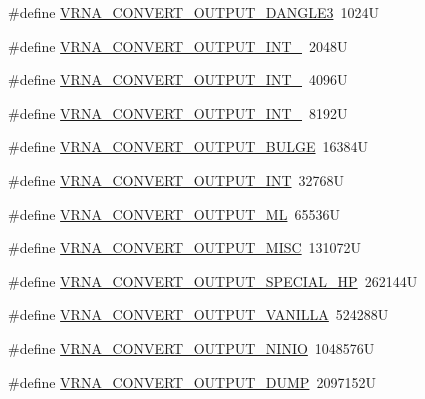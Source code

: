 \begin{DoxyCompactItemize}
\item 
\#define \mbox{\hyperlink{group__energy__parameters__convert_ga34a8a5479ef885834ef32f3fb43d79bc}{V\+R\+N\+A\+\_\+\+C\+O\+N\+V\+E\+R\+T\+\_\+\+O\+U\+T\+P\+U\+T\+\_\+\+D\+A\+N\+G\+L\+E3}}~1024U
\item 
\#define \mbox{\hyperlink{group__energy__parameters__convert_ga079aafefd5f8ab57ee5120099a34bd25}{V\+R\+N\+A\+\_\+\+C\+O\+N\+V\+E\+R\+T\+\_\+\+O\+U\+T\+P\+U\+T\+\_\+\+I\+N\+T\+\_}}~2048U
\item 
\#define \mbox{\hyperlink{group__energy__parameters__convert_gacf770881d9034431ebe741642342a1f9}{V\+R\+N\+A\+\_\+\+C\+O\+N\+V\+E\+R\+T\+\_\+\+O\+U\+T\+P\+U\+T\+\_\+\+I\+N\+T\+\_}}~4096U
\item 
\#define \mbox{\hyperlink{group__energy__parameters__convert_gaa307671e2631cdacad9cbe4c6583b05f}{V\+R\+N\+A\+\_\+\+C\+O\+N\+V\+E\+R\+T\+\_\+\+O\+U\+T\+P\+U\+T\+\_\+\+I\+N\+T\+\_}}~8192U
\item 
\#define \mbox{\hyperlink{group__energy__parameters__convert_ga7092fe0be4de6f02cc0bf08e81af726a}{V\+R\+N\+A\+\_\+\+C\+O\+N\+V\+E\+R\+T\+\_\+\+O\+U\+T\+P\+U\+T\+\_\+\+B\+U\+L\+GE}}~16384U
\item 
\#define \mbox{\hyperlink{group__energy__parameters__convert_gac5c2289fdf8ff1b980976d1613ff943a}{V\+R\+N\+A\+\_\+\+C\+O\+N\+V\+E\+R\+T\+\_\+\+O\+U\+T\+P\+U\+T\+\_\+\+I\+NT}}~32768U
\item 
\#define \mbox{\hyperlink{group__energy__parameters__convert_gaf2c8755d64eff3852aa45df9ac80a4fe}{V\+R\+N\+A\+\_\+\+C\+O\+N\+V\+E\+R\+T\+\_\+\+O\+U\+T\+P\+U\+T\+\_\+\+ML}}~65536U
\item 
\#define \mbox{\hyperlink{group__energy__parameters__convert_ga46d5b1535ae86060b6317565b7c6b40b}{V\+R\+N\+A\+\_\+\+C\+O\+N\+V\+E\+R\+T\+\_\+\+O\+U\+T\+P\+U\+T\+\_\+\+M\+I\+SC}}~131072U
\item 
\#define \mbox{\hyperlink{group__energy__parameters__convert_gaa1ff48a79642d69579d1766561ec6db6}{V\+R\+N\+A\+\_\+\+C\+O\+N\+V\+E\+R\+T\+\_\+\+O\+U\+T\+P\+U\+T\+\_\+\+S\+P\+E\+C\+I\+A\+L\+\_\+\+HP}}~262144U
\item 
\#define \mbox{\hyperlink{group__energy__parameters__convert_ga0d4e8a836bb4864ab5129c085dbf592d}{V\+R\+N\+A\+\_\+\+C\+O\+N\+V\+E\+R\+T\+\_\+\+O\+U\+T\+P\+U\+T\+\_\+\+V\+A\+N\+I\+L\+LA}}~524288U
\item 
\#define \mbox{\hyperlink{group__energy__parameters__convert_ga2eb0462f16939ddacdaf751a88d675ce}{V\+R\+N\+A\+\_\+\+C\+O\+N\+V\+E\+R\+T\+\_\+\+O\+U\+T\+P\+U\+T\+\_\+\+N\+I\+N\+IO}}~1048576U
\item 
\#define \mbox{\hyperlink{group__energy__parameters__convert_gac86976e9c2a55b3a6481ea60044f6098}{V\+R\+N\+A\+\_\+\+C\+O\+N\+V\+E\+R\+T\+\_\+\+O\+U\+T\+P\+U\+T\+\_\+\+D\+U\+MP}}~2097152U
\end{DoxyCompactItemize}
